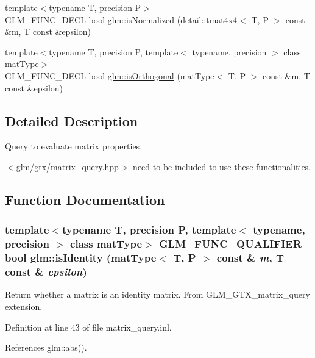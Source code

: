 \begin{CompactItemize}
\item 
{\footnotesize template$<$typename T, precision P$>$ }\\GLM\_\-FUNC\_\-DECL bool \hyperlink{group__gtx__matrix__query_g0005612df8bcf46d6dda35d373a61fbb}{glm::isNormalized} (detail::tmat4x4$<$ T, P $>$ const \&m, T const \&epsilon)
\item 
{\footnotesize template$<$typename T, precision P, template$<$ typename, precision $>$ class matType$>$ }\\GLM\_\-FUNC\_\-DECL bool \hyperlink{group__gtx__matrix__query_gbaeee016acd42f7a58bd1de063a3061b}{glm::isOrthogonal} (matType$<$ T, P $>$ const \&m, T const \&epsilon)
\end{CompactItemize}


\subsection{Detailed Description}
Query to evaluate matrix properties. 

$<$glm/gtx/matrix\_\-query.hpp$>$ need to be included to use these functionalities. 

\subsection{Function Documentation}
\hypertarget{group__gtx__matrix__query_gb4ab3ce59ca59a610875732215027cc3}{
\subsubsection[isIdentity]{\setlength{\rightskip}{0pt plus 5cm}template$<$typename T, precision P, template$<$ typename, precision $>$ class matType$>$ GLM\_\-FUNC\_\-QUALIFIER bool glm::isIdentity (matType$<$ T, P $>$ const \& {\em m}, \/  T const \& {\em epsilon})}}
\label{group__gtx__matrix__query_gb4ab3ce59ca59a610875732215027cc3}


Return whether a matrix is an identity matrix. From GLM\_\-GTX\_\-matrix\_\-query extension. 

Definition at line 43 of file matrix\_\-query.inl.

References glm::abs().


